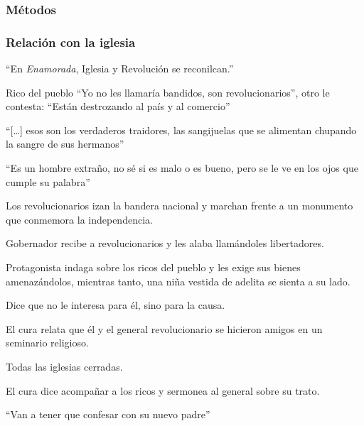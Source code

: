 \subsubsection{Métodos}
\subsubsection{Relación con la iglesia}
    \begin{compactitem}
    \item ``En \emph{Enamorada}, Iglesia y Revolución se reconilcan.''\autocite[377]{sanchez_vi._2010}
    \item Rico del pueblo ``Yo no les llamaría bandidos, son revolucionarios'', otro le contesta: ``Están destrozando al país y al comercio''\autocite[5:31-5:46]{fernandez_enamorada_1946}
    \item ``[\ldots] esos son los verdaderos traidores, las sangijuelas que se alimentan chupando la sangre de sus hermanos''\autocite[14:11]{fernandez_enamorada_1946}
    \item ``Es un hombre extraño, no sé si es malo o es bueno, pero se le ve en los ojos que cumple su palabra''\autocite[39:00]{fernandez_enamorada_1946}
    \item Los revolucionarios izan la bandera nacional y marchan frente a un monumento que conmemora la independencia.\autocite[03:04]{fernandez_enamorada_1946}
    \item Gobernador recibe a revolucionarios y les alaba llamándoles libertadores.\autocite[3:52]{fernandez_enamorada_1946}
    \item Protagonista indaga sobre los ricos del pueblo y les exige sus bienes amenazándolos, mientras tanto, una niña vestida de adelita se sienta a su lado.\autocite[4:57-5:13]{fernandez_enamorada_1946}
    \begin{compactitem}
    \item Dice que no le interesa para él, sino para la causa.\autocite[21:38]{fernandez_enamorada_1946} 
    \end{compactitem}
    \item El cura relata que él y el general revolucionario se hicieron amigos en un seminario religioso.\autocite[4:57-5:13]{fernandez_enamorada_1946}
    \item Todas las iglesias cerradas.\autocite[8:50]{fernandez_enamorada_1946}
    \item El cura dice acompañar a los ricos y sermonea al general sobre su trato.\autocite[9:30]{fernandez_enamorada_1946}
    \item ``Van a tener que confesar con su nuevo padre''\autocite[9:56]{fernandez_enamorada_1946}

\end{compactitem}
